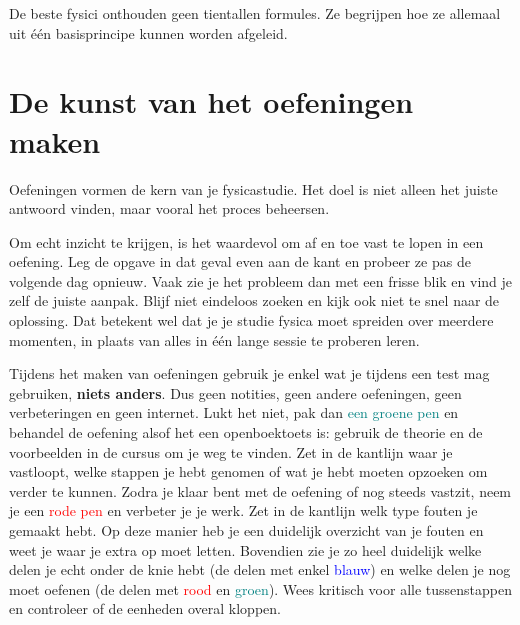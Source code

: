 \documentclass{ximera}
\begin{document}
\begin{remark}
De beste fysici onthouden geen tientallen formules. Ze begrijpen hoe ze allemaal uit één basisprincipe kunnen worden afgeleid.
\end{remark}


\section*{De kunst van het oefeningen maken}

Oefeningen vormen de kern van je fysicastudie.
Het doel is niet alleen het juiste antwoord vinden, maar vooral het proces beheersen.

Om echt inzicht te krijgen, is het waardevol om af en toe vast te lopen in een oefening.
Leg de opgave in dat geval even aan de kant en probeer ze pas de volgende dag opnieuw.
Vaak zie je het probleem dan met een frisse blik en vind je zelf de juiste aanpak.
Blijf niet eindeloos zoeken en kijk ook niet te snel naar de oplossing.
Dat betekent wel dat je je studie fysica moet spreiden over meerdere momenten,
in plaats van alles in één lange sessie te proberen leren.

Tijdens het maken van oefeningen gebruik je enkel wat je tijdens een test mag gebruiken, \textbf{niets anders}.
Dus geen notities, geen andere oefeningen, geen verbeteringen en geen internet.
\newline
Lukt het niet, pak dan \textcolor{teal}{een groene pen} en behandel de oefening alsof het een openboektoets is: gebruik de theorie en de voorbeelden in de cursus om je weg te vinden.
Zet in de kantlijn waar je vastloopt, welke stappen je hebt genomen of wat je hebt moeten opzoeken om verder te kunnen.
\newline
Zodra je klaar bent met de oefening of nog steeds vastzit, neem je een \textcolor{red}{rode pen} en verbeter je je werk. Zet in de kantlijn welk type fouten je gemaakt hebt.
Op deze manier heb je een duidelijk overzicht van je fouten en weet je waar je extra op moet letten.
Bovendien zie je zo heel duidelijk welke delen je echt onder de knie hebt (de delen met enkel \textcolor{blue}{blauw}) en welke delen je nog moet oefenen (de delen met \textcolor{red}{rood} en \textcolor{teal}{groen}).
Wees kritisch voor alle tussenstappen en controleer of de eenheden overal kloppen.
\end{document}
